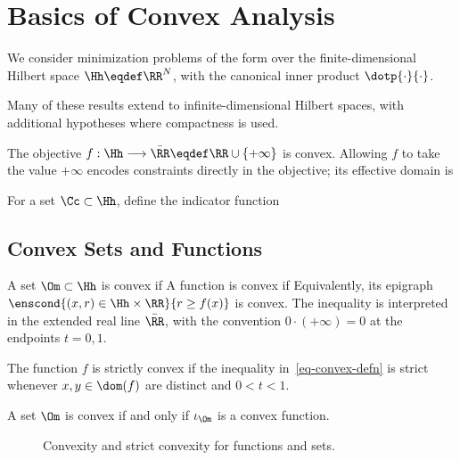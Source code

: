 \section{Basics of Convex Analysis}

We consider minimization problems of the form
over the finite-dimensional Hilbert space $\Hh \eqdef \RR^N$, with the canonical inner product $\dotp{\cdot}{\cdot}$.
 
Many of these results extend to infinite-dimensional Hilbert spaces, with additional hypotheses where compactness is used.

The objective $f : \Hh \longrightarrow \bar \RR \eqdef \RR \cup \{+\infty\}$ is convex. Allowing $f$ to take the value $+\infty$ encodes constraints directly in the objective; its effective domain is

For a set $\Cc \subset \Hh$, define the indicator function


                                                                                  
\subsection{Convex Sets and Functions}

A set $\Om \subset \Hh$ is convex if
A function is convex if
Equivalently, its epigraph $\enscond{(x,r) \in \Hh \times \RR}{r \geq f(x)}$ is convex. The inequality is interpreted in the extended real line $\bar\RR$, with the convention $0\cdot(+\infty)=0$ at the endpoints $t=0,1$.
 
The function $f$ is strictly convex if the inequality in~\eqref{eq-convex-defn} is strict whenever $x,y\in\dom(f)$ are distinct and $0<t<1$.
 
A set $\Om$ is convex if and only if $\iota_{\Om}$ is a convex function.



\begin{figure}[tbp]
\centering
{}
\caption{Convexity and strict convexity for functions and sets.}
\label{fig-convex-examples}
\end{figure}




